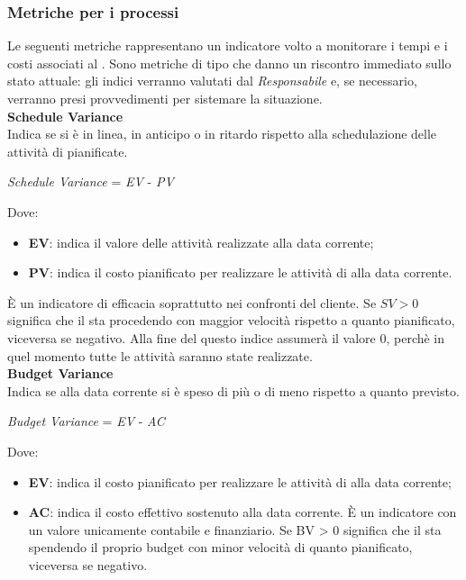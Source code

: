 \subsubsection{Metriche per i processi}\label{MetricheProc}
\hypertarget{metriche_processi}{}
Le seguenti metriche rappresentano un indicatore volto a monitorare i tempi e i costi associati al . Sono metriche di tipo  che danno un riscontro immediato sullo stato attuale: gli indici verranno valutati dal \textit{Responsabile} e, se necessario, verranno presi provvedimenti per sistemare la situazione.\\

\textbf{Schedule Variance}\\

Indica se si è in linea, in anticipo o in ritardo rispetto alla schedulazione delle attività di 
pianificate.
\begin{center}
	\textit{Schedule Variance} = \textit{EV} - \textit{PV} 
\end{center}
Dove:
\begin{itemize}
	\item \textbf{EV}: indica il valore delle attivit\`a realizzate alla data corrente;
	\item \textbf{PV}: indica il costo pianificato per realizzare le attività di  alla data corrente.
\end{itemize}
\`E un indicatore di efficacia soprattutto nei confronti del cliente. Se \begin{math}{SV > 0}\end{math} significa che il  sta procedendo con maggior velocit\`a rispetto a quanto pianificato, viceversa se negativo. Alla fine del  questo indice assumer\`a il valore 0, perch\`e in quel momento tutte le attivit\`a saranno state realizzate.\\

\textbf{Budget Variance}\\

Indica se alla data corrente si \`e speso di pi\`u o di meno rispetto a quanto previsto.\\
\begin{center}
	\textit{Budget Variance} = \textit{EV} - \textit{AC}
\end{center}
Dove:
\begin{itemize}
	\item \textbf{EV}: indica il costo pianificato per realizzare le attività di  alla data corrente;
	\item \textbf{AC}: indica il costo effettivo sostenuto alla data corrente. \`E un indicatore con
un valore unicamente contabile e finanziario. Se BV > 0 significa che il  sta spendendo
il proprio budget con minor velocità di quanto pianificato, viceversa se negativo.
\end{itemize}

